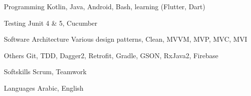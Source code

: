 

\begin{cvskills}

  \cvskill
    {Programming} %
    {Kotlin, Java, Android, Bash, learning (Flutter, Dart)} %

  \cvskill
    {Testing} %
    {Junit 4 \& 5, Cucumber} %

  \cvskill
    {Software Architecture} %
    {Various design patterns, Clean, MVVM, MVP, MVC, MVI} %

  \cvskill
    {Others} %
    {Git, TDD, Dagger2, Retrofit, Gradle, GSON, RxJava2, Firebase} %

  \cvskill
    {Softskills} %
    {Scrum, Teamwork} %

  \cvskill
    {Languages} %
    {Arabic, English} %

\end{cvskills}